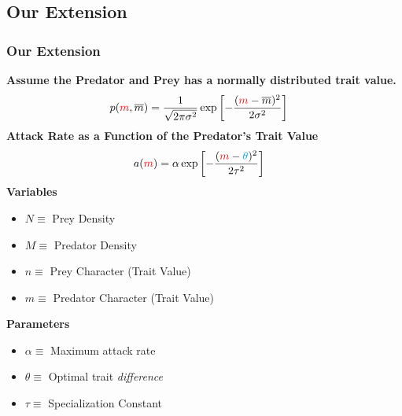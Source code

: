 \documentclass[10pt]{beamer}
\begin{document}
\subsection{Our Extension}
\begin{frame}
	\frametitle{Our Extension}
	{\bf Assume the {\color{red}Predator} and {\color{blue}Prey} has a normally distributed trait value.}
	\begin{align*}
		p({\color{red}m}, \overline{m}) &= \frac{1}{\sqrt{2\pi\sigma^2}}\exp\left[{-\frac{({\color{red}m} - \overline{m})^2}{2\sigma^2}}\right]
	\end{align*}
	{\bf Attack Rate as a Function of the {\color{red}Predator's Trait Value}}
	\begin{align*}
		a({\color{red}m}) &= \alpha \exp\left[-\frac{({\color{red}m} - {\color{cyan}\theta})^2}{2\tau^2}\right]
	\end{align*}
	{\bf Variables}
	\begin{itemize}
		\item $N \equiv $ Prey Density
		\item $M \equiv $ Predator Density
		\item $n \equiv $ Prey Character (Trait Value)
		\item $m \equiv $ Predator Character (Trait Value)
	\end{itemize}
	{\bf Parameters}
	\begin{itemize}
		\item $\alpha \equiv $ Maximum attack rate
		\item $\theta \equiv $ Optimal trait {\color{red}\it difference}
		\item $\tau \equiv $ Specialization Constant
	\end{itemize}
\end{frame}
\end{document}

